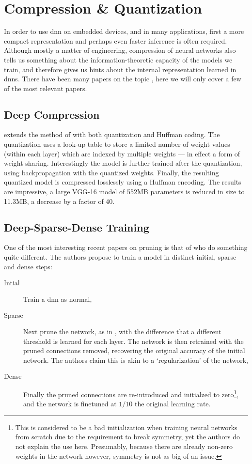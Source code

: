 \documentclass[thesis]{subfiles}
\begin{document}
	\section{Compression \& Quantization}
	In order to use \gls{dnn} on embedded devices, and in many applications, first a more compact representation and perhaps even faster inference is often required. Although mostly a matter of engineering, compression of neural networks also tells us something about the information-theoretic capacity of the models we train, and therefore gives us hints about the internal representation learned in \glspl{dnn}. There have been many papers on the topic \citep{han2015deep,han2015learning,han2016dsd,Kim2016,rastegari2016xnor,ullrich2017soft}, here we will only cover a few of the most relevant papers.

	\subsection{Deep Compression}
	\citet{han2015deep} extends the method of \citet{han2015learning} with both quantization and Huffman coding. The quantization uses a look-up table to store a limited number of weight values (within each layer) which are indexed by multiple weights --- in effect a form of weight sharing. Interestingly the model is further trained after the quantization, using backpropagation with the quantized weights. Finally, the resulting quantized model is compressed losslessly using a Huffman encoding. The results are impressive, a large VGG-16 model of 552MB parameters is reduced in size to 11.3MB, a decrease by a factor of 40.

	\subsection{Deep-Sparse-Dense Training}
	One of the most interesting recent papers on pruning is that of \citet{han2016dsd} who do something quite different. The authors propose to train a model in distinct initial, sparse and dense steps:
	\begin{description}
		\item[Intial] Train a \gls{dnn} as normal,
		\item[Sparse] Next prune the network, as in \citet{han2015learning}, with the difference that a different threshold is learned for each layer. The network is then retrained with the pruned connections removed, recovering the original accuracy of the initial network. The authors claim this is akin to a `regularization' of the network,
		\item[Dense] Finally the pruned connections are re-introduced and initialzed to zero\footnote{This is considered to be a bad initialization when training neural networks from scratch due to the requirement to break symmetry, yet the authors do not explain the use here. Presumably, because there are already non-zero weights in the network however, symmetry is not as big of an issue.}, and the network is \gls{finetuned} at $1/10$ the original learning rate.
	\end{description}
\end{document}
